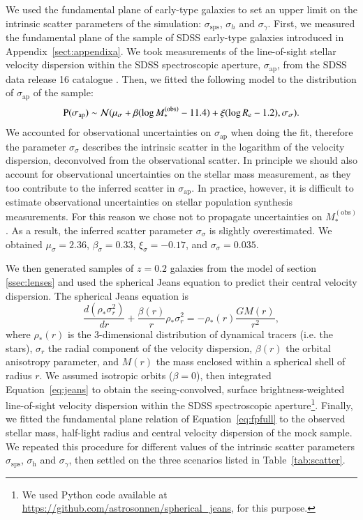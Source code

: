 \documentclass{aa}
\def\reff{R_{\mathrm{e}}}
\def\mobs{M_*^{(\mathrm{obs})}}
\def\Tref#1{Table~\ref{#1}\xspace}
\def\Eref#1{Equation~\ref{#1}\xspace}
\def\pr{{\rm P}}
\begin{document}
We used the fundamental plane of early-type galaxies to set an upper limit on the intrinsic scatter parameters of the simulation: $\sigma_{\mathrm{sps}}$, $\sigma_h$ and $\sigma_\gamma$.
First, we measured the fundamental plane of the sample of SDSS early-type galaxies introduced in Appendix~\ref{sect:appendixa}.
We took measurements of the line-of-sight stellar velocity dispersion within the SDSS spectroscopic aperture, $\sigma_{\mathrm{ap}}$, from the SDSS data release 16 catalogue \citep{Ahu++20}.
Then, we fitted the following model to the distribution of $\sigma_{\mathrm{ap}}$ of the sample:
\begin{equation}\label{eq:fpfull}
\pr(\sigma_{\mathrm{ap}}) \sim \mathcal{N}(\mu_{\sigma} + \beta(\log{\mobs} - 11.4) + \xi(\log{\reff} - 1.2), \sigma_{\sigma}).
\end{equation}
We accounted for observational uncertainties on $\sigma_{\mathrm{ap}}$ when doing the fit, therefore the parameter $\sigma_{\sigma}$ describes the intrinsic scatter in the logarithm of the velocity dispersion, deconvolved from the observational scatter.
In principle we should also account for observational uncertainties on the stellar mass measurement, as they too contribute to the inferred scatter in $\sigma_{\mathrm{ap}}$. In practice, however, it is difficult to estimate observational uncertainties on stellar population synthesis measurements.
For this reason we chose not to propagate uncertainties on $\mobs$. As a result, the inferred scatter parameter $\sigma_{\sigma}$ is slightly overestimated.
We obtained $\mu_{\sigma}=2.36$, $\beta_{\sigma}=0.33$, $\xi_\sigma=-0.17$, and $\sigma_{\sigma}=0.035$.

We then generated samples of $z=0.2$ galaxies from the model of section \ref{ssec:lenses} and used the spherical Jeans equation to predict their central velocity dispersion.
The spherical Jeans equation is \citep{B+T87}
\begin{equation}\label{eq:jeans}
\frac{d(\rho_*\sigma_r^2)}{dr} + \frac{\beta(r)}{r}\rho_*\sigma_r^2 = -\rho_*(r)\frac{GM(r)}{r^2},
\end{equation}
where $\rho_*(r)$ is the 3-dimensional distribution of dynamical tracers (i.e. the stars), $\sigma_r$ the radial component of the velocity dispersion, $\beta(r)$ the orbital anisotropy parameter, and $M(r)$ the mass enclosed within a spherical shell of radius $r$. 
We assumed isotropic orbits ($\beta=0$), then integrated \Eref{eq:jeans} to obtain the seeing-convolved, surface brightness-weighted line-of-sight velocity dispersion within the SDSS spectroscopic aperture\footnote{We used Python code available at \url{https://github.com/astrosonnen/spherical_jeans}, for this purpose.}.
Finally, we fitted the fundamental plane relation of \Eref{eq:fpfull} to the observed stellar mass, half-light radius and central velocity dispersion of the mock sample.
We repeated this procedure for different values of the intrinsic scatter parameters $\sigma_{\mathrm{sps}}$, $\sigma_\mathrm{h}$ and $\sigma_\gamma$, then settled on the three scenarios listed in \Tref{tab:scatter}.
\end{document}
